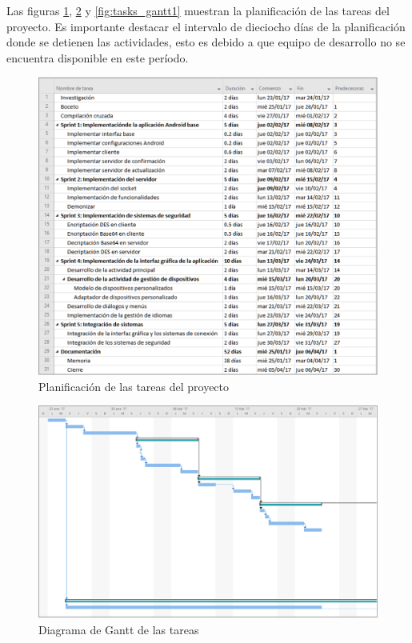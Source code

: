 \documentclass[12pt]{article}
\begin{document}
        Las figuras \ref{fig:tasks}, \ref{fig:tasks_gantt0} y \ref{fig:tasks_gantt1} muestran la planificación de las tareas del proyecto. Es importante destacar el intervalo de dieciocho días de la planificación donde se detienen las actividades, esto es debido a que equipo de desarrollo no se encuentra disponible en este período.

        \begin{figure}[h!]
            \centering
                \includegraphics[scale=0.7]{tasks.eps}
                \caption{Planificación de las tareas del proyecto}
                \label{fig:tasks}
        \end{figure}

        \begin{figure}[h!]
            \centering
                \includegraphics[scale=0.5]{tasks_gantt0.eps}
                \caption{Diagrama de Gantt de las tareas}
                \label{fig:tasks_gantt0}
        \end{figure}
\end{document}
